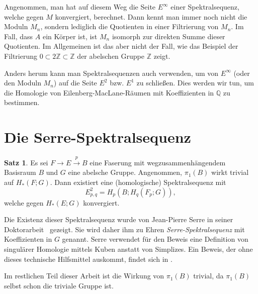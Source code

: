 \documentclass[11pt, a4paper, german]{article}
\theoremstyle{definition}
\newtheorem{satz}[lem]{Satz}
\theoremstyle{remark}
\newcommand{\Z}{\mathbb{Z}} %
\newcommand{\Q}{\mathbb{Q}} %
\begin{document}
Angenommen, man hat auf diesem Weg die Seite $E^\infty$ einer Spektralsequenz, welche gegen $M$ konvergiert, berechnet.
Dann kennt man immer noch nicht die Moduln $M_n$, sondern lediglich die Quotienten in einer Filtrierung von $M_n$.
Im Fall, dass $A$ ein Körper ist, ist $M_n$ isomorph zur direkten Summe dieser Quotienten.
Im Allgemeinen ist das aber nicht der Fall, wie das Beispiel der Filtrierung $0 \subset 2 \Z \subset \Z$ der abelschen Gruppe $\Z$ zeigt.

Anders herum kann man Spektralsequenzen auch verwenden, um von $E^\infty$ (oder den Moduln $M_n$) auf die Seite $E^2$ bzw. $E^1$ zu schließen.
Dies werden wir tun, um die Homologie von Eilenberg-MacLane-Räumen mit Koeffizienten in $\Q$ zu bestimmen.

\section{Die Serre-Spektralsequenz}

\begin{satz}
  Es sei $F \to E \xrightarrow{p} B$ eine Faserung mit wegzusammenhängendem Basisraum $B$ und $G$ eine abelsche Gruppe.
  Angenommen, $\pi_1(B)$ wirkt trivial auf $H_*(F; G)$.
  Dann existiert eine (homologische) Spektralsequenz mit
  \[ E^2_{p,q} = H_p(B; H_q(F_p; G)), \]
  welche gegen $H_*(E; G)$ konvergiert.
\end{satz}


Die Existenz dieser Spektralsequenz wurde von Jean-Pierre Serre in seiner Doktorarbeit~\cite{serre:thesis} gezeigt.
Sie wird daher ihm zu Ehren \emph{Serre-Spektralsequenz} mit Koeffizienten in $G$ genannt.
Serre verwendet für den Beweis eine Definition von singulärer Homologie mittels Kuben anstatt von Simplizes.
Ein Beweis, der ohne dieses technische Hilfsmittel auskommt, findet sich in \cite[Thm 1.3]{hatcher:ss}.

Im restlichen Teil dieser Arbeit ist die Wirkung von $\pi_1(B)$ trivial, da $\pi_1(B)$ selbst schon die triviale Gruppe ist.
\end{document}
